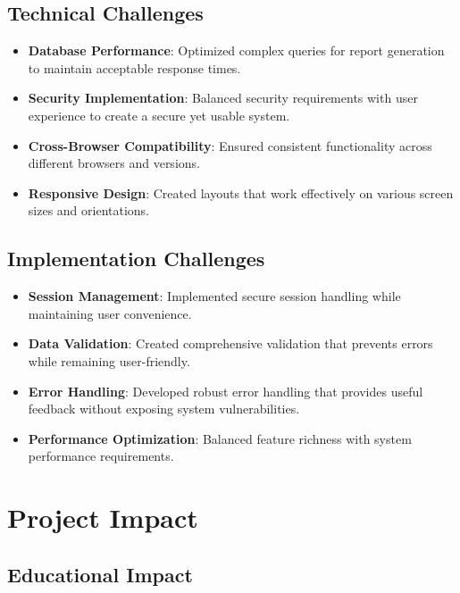 \subsection{Technical Challenges}

\begin{itemize}
    \item \textbf{Database Performance}: Optimized complex queries for report generation to maintain acceptable response times.
    
    \item \textbf{Security Implementation}: Balanced security requirements with user experience to create a secure yet usable system.
    
    \item \textbf{Cross-Browser Compatibility}: Ensured consistent functionality across different browsers and versions.
    
    \item \textbf{Responsive Design}: Created layouts that work effectively on various screen sizes and orientations.
\end{itemize}

\subsection{Implementation Challenges}

\begin{itemize}
    \item \textbf{Session Management}: Implemented secure session handling while maintaining user convenience.
    
    \item \textbf{Data Validation}: Created comprehensive validation that prevents errors while remaining user-friendly.
    
    \item \textbf{Error Handling}: Developed robust error handling that provides useful feedback without exposing system vulnerabilities.
    
    \item \textbf{Performance Optimization}: Balanced feature richness with system performance requirements.
\end{itemize}

\section{Project Impact}

\subsection{Educational Impact}

